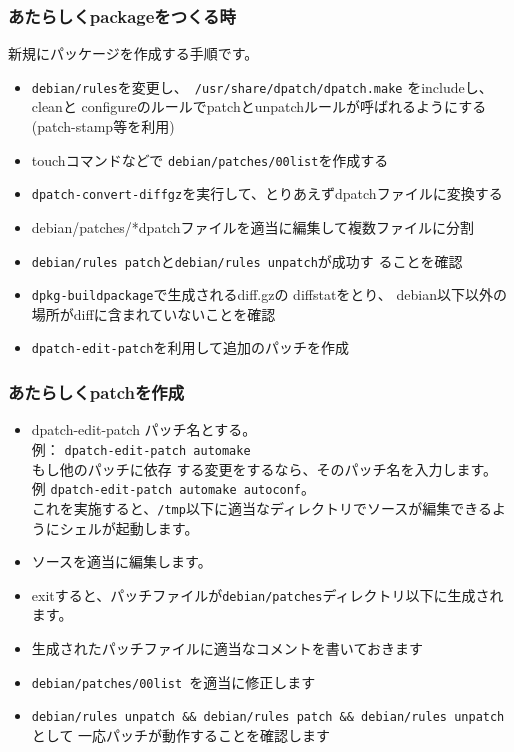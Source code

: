 \documentclass[mingoth]{jsarticle}
\begin{document}
\subsubsection{あたらしくpackageをつくる時}

新規にパッケージを作成する手順です。

\begin{itemize}
 \item  {\tt debian/rules}を変更し、{\tt
	    /usr/share/dpatch/dpatch.make} をincludeし、 cleanと
	    configureのルールでpatchとunpatchルールが呼ばれるようにする
	    (patch-stamp等を利用)
 \item touchコマンドなどで {\tt debian/patches/00list}を作成する
 \item {\tt dpatch-convert-diffgz}を実行して、とりあえずdpatchファイルに変換する
 \item debian/patches/*dpatchファイルを適当に編集して複数ファイルに分割
 \item {\tt  debian/rules patch}と{\tt debian/rules unpatch}が成功す
	    ることを確認
 \item {\tt dpkg-buildpackage}で生成されるdiff.gzの
	    diffstatをとり、
	    debian以下以外の場所がdiffに含まれていないことを確認
 \item {\tt dpatch-edit-patch}を利用して追加のパッチを作成
\end{itemize}

\subsubsection{あたらしくpatchを作成}

\begin{itemize}
 
 \item dpatch-edit-patch パッチ名とする。 \\
       例：
       { \tt dpatch-edit-patch automake }  \\もし他のパッチに依存
 する変更をするなら、そのパッチ名を入力します。 \\ 例 {\tt dpatch-edit-patch
automake autoconf}。\\
       これを実施すると、{\tt /tmp}以下に適当なディレクトリでソースが編集できるようにシェルが起動します。
 \item  ソースを適当に編集します。
 \item  exitすると、パッチファイルが{\tt debian/patches}ディレクトリ以下に生成されます。
 \item  生成されたパッチファイルに適当なコメントを書いておきます
 \item  {\tt debian/patches/00list }を適当に修正します
 \item  {\tt debian/rules unpatch \&\& debian/rules patch \&\& debian/rules unpatch }として 一応パッチが動作することを確認します
\end{itemize}
\end{document}
